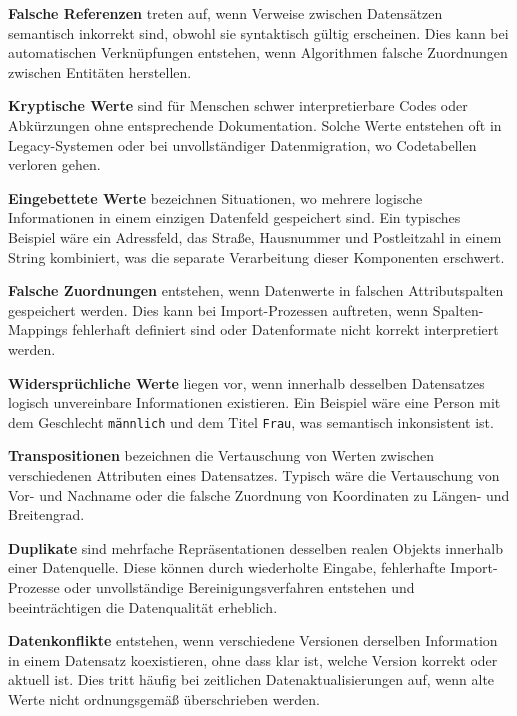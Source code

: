 \documentclass[
    a4paper,
    12pt,
    headinclude=true,
    BCOR=10mm,
]{scrreprt}
\begin{document}
\textbf{Falsche Referenzen} treten auf, wenn Verweise zwischen Datensätzen semantisch inkorrekt sind, obwohl sie syntaktisch gültig erscheinen. Dies kann bei automatischen Verknüpfungen entstehen, wenn Algorithmen falsche Zuordnungen zwischen Entitäten herstellen.

\textbf{Kryptische Werte} sind für Menschen schwer interpretierbare Codes oder Abkürzungen ohne entsprechende Dokumentation. Solche Werte entstehen oft in Legacy-Systemen oder bei unvollständiger Datenmigration, wo Codetabellen verloren gehen.

\textbf{Eingebettete Werte} bezeichnen Situationen, wo mehrere logische Informationen in einem einzigen Datenfeld gespeichert sind. Ein typisches Beispiel wäre ein Adressfeld, das Straße, Hausnummer und Postleitzahl in einem String kombiniert, was die separate Verarbeitung dieser Komponenten erschwert.

\textbf{Falsche Zuordnungen} entstehen, wenn Datenwerte in falschen Attributspalten gespeichert werden. Dies kann bei Import-Prozessen auftreten, wenn Spalten-Mappings fehlerhaft definiert sind oder Datenformate nicht korrekt interpretiert werden.

\textbf{Widersprüchliche Werte} liegen vor, wenn innerhalb desselben Datensatzes logisch unvereinbare Informationen existieren. Ein Beispiel wäre eine Person mit dem Geschlecht \texttt{männlich} und dem Titel \texttt{Frau}, was semantisch inkonsistent ist.

\textbf{Transpositionen} bezeichnen die Vertauschung von Werten zwischen verschiedenen Attributen eines Datensatzes. Typisch wäre die Vertauschung von Vor- und Nachname oder die falsche Zuordnung von Koordinaten zu Längen- und Breitengrad.

\textbf{Duplikate} sind mehrfache Repräsentationen desselben realen Objekts innerhalb einer Datenquelle. Diese können durch wiederholte Eingabe, fehlerhafte Import-Prozesse oder unvollständige Bereinigungsverfahren entstehen und beeinträchtigen die Datenqualität erheblich.

\textbf{Datenkonflikte} entstehen, wenn verschiedene Versionen derselben Information in einem Datensatz koexistieren, ohne dass klar ist, welche Version korrekt oder aktuell ist. Dies tritt häufig bei zeitlichen Datenaktualisierungen auf, wenn alte Werte nicht ordnungsgemäß überschrieben werden.



\newpage
{}
\end{document}

